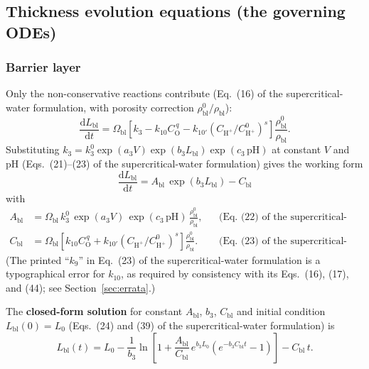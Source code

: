 \subsection{Thickness evolution equations (the governing ODEs)}
\label{sec:odes}

\subsubsection{Barrier layer}

Only the non-conservative reactions contribute
(Eq.~(16) of the supercritical-water formulation, with porosity correction
$\rho^0_{\mathrm{bl}}/\rho_{\mathrm{bl}}$):
\begin{equation}
\frac{\mathrm{d}L_{\mathrm{bl}}}{\mathrm{d}t}
= \Omega_{\mathrm{bl}} \left[ k_3 - k_{10} C_{\mathrm{O}}^{\,q}
- k_{10'} \left( C_{\mathrm{H^+}}/C^0_{\mathrm{H^+}} \right)^{s} \right]
\frac{\rho^0_{\mathrm{bl}}}{\rho_{\mathrm{bl}}} .
\end{equation}
Substituting
$k_3 = k_3^{0} \exp(a_3 V) \exp(b_3 L_{\mathrm{bl}}) \exp(c_3\,\mathrm{pH})$
at constant $V$ and pH (Eqs.~(21)--(23) of the supercritical-water
formulation) gives the working form
\begin{equation}
\boxed{\;
\frac{\mathrm{d}L_{\mathrm{bl}}}{\mathrm{d}t}
= A_{\mathrm{bl}}\, \exp( b_3 L_{\mathrm{bl}} ) - C_{\mathrm{bl}}
\;}
\label{eq:blode}
\end{equation}
with
\begin{align}
A_{\mathrm{bl}} &= \Omega_{\mathrm{bl}}\, k_3^{0}\, \exp(a_3 V)\,
\exp(c_3\,\mathrm{pH})\, \frac{\rho^0_{\mathrm{bl}}}{\rho_{\mathrm{bl}}} ,
&&\text{(Eq.~(22) of the supercritical-water formulation)}
\label{eq:Abl} \\
C_{\mathrm{bl}} &= \Omega_{\mathrm{bl}} \left[ k_{10} C_{\mathrm{O}}^{\,q}
+ k_{10'} \left( C_{\mathrm{H^+}}/C^0_{\mathrm{H^+}} \right)^{s} \right]
\frac{\rho^0_{\mathrm{bl}}}{\rho_{\mathrm{bl}}} .
&&\text{(Eq.~(23) of the supercritical-water formulation)}
\label{eq:Cbl}
\end{align}
(The printed ``$k_9$'' in Eq.~(23) of the supercritical-water formulation is a
typographical error for $k_{10}$, as required by consistency with its
Eqs.~(16), (17), and (44); see Section~\ref{sec:errata}.)

The \textbf{closed-form solution} for constant $A_{\mathrm{bl}}$, $b_3$,
$C_{\mathrm{bl}}$ and initial condition $L_{\mathrm{bl}}(0) = L_0$
(Eqs.~(24) and (39) of the supercritical-water formulation) is
\begin{equation}
L_{\mathrm{bl}}(t) = L_0 - \frac{1}{b_3}
\ln\!\left[ 1 + \frac{A_{\mathrm{bl}}}{C_{\mathrm{bl}}}\, e^{b_3 L_0}
\left( e^{-b_3 C_{\mathrm{bl}} t} - 1 \right) \right]
- C_{\mathrm{bl}}\, t .
\label{eq:blclosed}
\end{equation}

